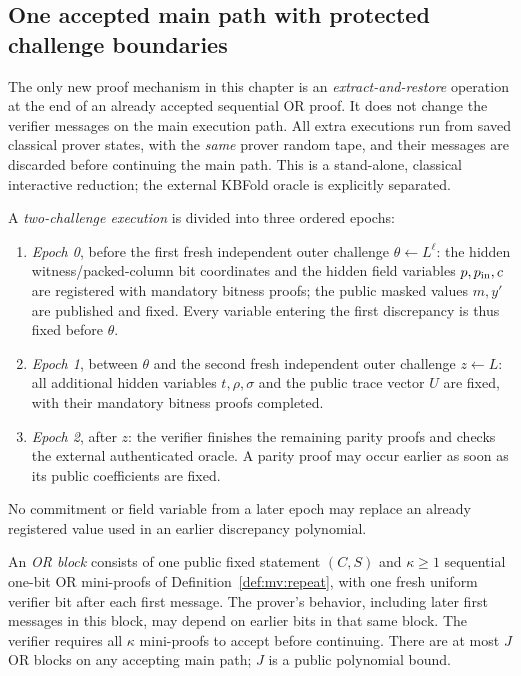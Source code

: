 \subsection{One accepted main path with protected challenge boundaries}\label{sec:global:checkpoints}
The only new proof mechanism in this chapter is an
\emph{extract-and-restore} operation at the end of an
already accepted sequential OR proof. It does not change
the verifier messages on the main execution path.
All extra executions run from saved classical prover
states, with the \emph{same} prover random tape, and their
messages are discarded before continuing the main path.
This is a stand-alone, classical interactive reduction;
the external KBFold oracle is explicitly separated.

\begin{definition}\label{def:global:epochs}
A \emph{two-challenge execution} is divided into
three ordered epochs:
\begin{enumerate}[label=\textup{(\roman*)}]
\item \emph{Epoch 0}, before the first fresh independent
outer challenge $\theta\leftarrow L^\ell$:
the hidden witness/packed-column bit coordinates
and the hidden field variables $p,p_{\rm in},c$
are registered with mandatory bitness proofs;
the public masked values $m,y'$ are published
and fixed. Every variable entering the first
discrepancy is thus fixed before $\theta$.
\item \emph{Epoch 1}, between $\theta$ and the second
fresh independent outer challenge $z\leftarrow L$:
all additional hidden variables $t,\rho,\sigma$
and the public trace vector $U$ are fixed, with
their mandatory bitness proofs completed.
\item \emph{Epoch 2}, after $z$: the verifier
finishes the remaining parity proofs and
checks the external authenticated oracle.
A parity proof may occur earlier as soon
as its public coefficients are fixed.
\end{enumerate}
No commitment or field variable from a later
epoch may replace an already registered value
used in an earlier discrepancy polynomial.
\end{definition}

\begin{definition}\label{def:global:block}
An \emph{OR block} consists of one public fixed
statement $(C,S)$ and $\kappa\ge1$ sequential
one-bit OR mini-proofs of
Definition~\ref{def:mv:repeat}, with one
fresh uniform verifier bit after each first
message. The prover's behavior, including
later first messages in this block, may depend
on earlier bits in that same block.
The verifier requires all $\kappa$ mini-proofs
to accept before continuing.
There are at most $J$ OR blocks on any
accepting main path; $J$ is a public
polynomial bound.
\end{definition}


